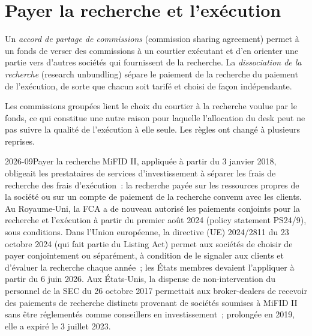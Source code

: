\section{Payer la recherche et l'exécution}

\begin{definition}\label{def:mx:the-buy-side-trading-desk-and-its-brokers:csa}
Un \emph{accord de partage de commissions} (commission sharing agreement) permet à un fonds de verser des commissions à un courtier exécutant et d'en orienter une partie vers
d'autres sociétés qui fournissent de la recherche. La \emph{dissociation de la recherche} (research unbundling) sépare le paiement de la recherche du paiement de
l'exécution, de sorte que chacun soit tarifé et choisi de façon indépendante.
\end{definition}

Les commissions groupées lient le choix du courtier à la recherche voulue par le fonds, ce qui constitue une autre raison pour laquelle l'allocation du desk peut ne pas suivre la qualité de l'exécution
à elle seule. Les règles ont changé à plusieurs reprises.

\begin{dated}{2026-09}{Payer la recherche}\label{dat:mx:the-buy-side-trading-desk-and-its-brokers:research}
MiFID II, appliquée à partir du 3 janvier 2018, obligeait les prestataires de services d'investissement à séparer les frais de recherche des frais d'exécution~: la recherche payée sur les
ressources propres de la société ou sur un compte de paiement de la recherche convenu avec les clients. Au Royaume-Uni, la FCA a de nouveau autorisé les paiements conjoints pour la recherche et
l'exécution à partir du premier août 2024 (policy statement PS24/9), sous conditions. Dans l'Union européenne, la directive (UE) 2024/2811 du 23 octobre 2024 (qui fait partie du
Listing Act) permet aux sociétés de choisir de payer conjointement ou séparément, à condition de le signaler aux clients et d'évaluer la recherche chaque année~; les États membres devaient l'appliquer
à partir du 6 juin 2026. Aux États-Unis, la dispense de non-intervention du personnel de la SEC du 26 octobre 2017 permettait aux broker-dealers de recevoir des paiements de recherche distincts
provenant de sociétés soumises à MiFID II sans être réglementés comme conseillers en investissement~; prolongée en 2019, elle a expiré le 3 juillet 2023.
\end{dated}

